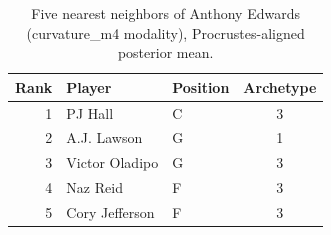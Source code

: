 \begin{table}[htbp]
  \centering\small
  \begin{tabular}{rllc}
    \toprule
    Rank & Player & Position & Archetype \\
    \midrule
    1 & PJ Hall & C & 3 \\
    2 & A.J. Lawson & G & 1 \\
    3 & Victor Oladipo & G & 3 \\
    4 & Naz Reid & F & 3 \\
    5 & Cory Jefferson & F & 3 \\
    \bottomrule
  \end{tabular}
  \caption{Five nearest neighbors of Anthony Edwards (curvature_m4 modality), Procrustes-aligned posterior mean.}
  \label{tab:Anthony_Edwards_neighbors_curvature_m4}
\end{table}

